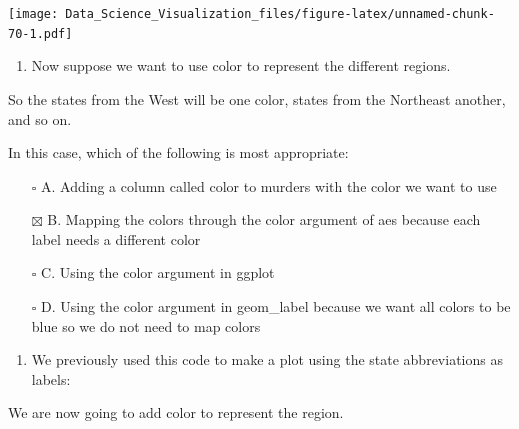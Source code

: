 \documentclass[
]{article}
\newenvironment{Shaded}{\begin{snugshade}}{\end{snugshade}}
\newcommand{\CommentTok}[1]{\textcolor[rgb]{0.56,0.35,0.01}{\textit{#1}}}
\newcommand{\DataTypeTok}[1]{\textcolor[rgb]{0.13,0.29,0.53}{#1}}
\newcommand{\KeywordTok}[1]{\textcolor[rgb]{0.13,0.29,0.53}{\textbf{#1}}}
\newcommand{\NormalTok}[1]{#1}
\newcommand{\OperatorTok}[1]{\textcolor[rgb]{0.81,0.36,0.00}{\textbf{#1}}}
\newcommand{\StringTok}[1]{\textcolor[rgb]{0.31,0.60,0.02}{#1}}
\providecommand{\tightlist}{%
  \setlength{\itemsep}{0pt}\setlength{\parskip}{0pt}}
\begin{document}
\texttt{[image: Data\_Science\_Visualization\_files/figure-latex/unnamed-chunk-70-1.pdf]}

\begin{enumerate}
\def\labelenumi{\arabic{enumi}.}
\setcounter{enumi}{10}
\tightlist
\item
  Now suppose we want to use color to represent the different regions.
\end{enumerate}

So the states from the West will be one color, states from the Northeast
another, and so on.

In this case, which of the following is most appropriate:

\begin{itemize}
\tightlist
\item[$\square$]
  A. Adding a column called color to murders with the color we want to
  use
\item[$\boxtimes$]
  B. Mapping the colors through the color argument of aes because each
  label needs a different color
\item[$\square$]
  C. Using the color argument in ggplot
\item[$\square$]
  D. Using the color argument in geom\_label because we want all colors
  to be blue so we do not need to map colors
\end{itemize}

\begin{enumerate}
\def\labelenumi{\arabic{enumi}.}
\setcounter{enumi}{11}
\tightlist
\item
  We previously used this code to make a plot using the state
  abbreviations as labels:
\end{enumerate}

\begin{Shaded}
\end{Shaded}

We are now going to add color to represent the region.

\begin{Shaded}
\end{Shaded}
\end{document}
